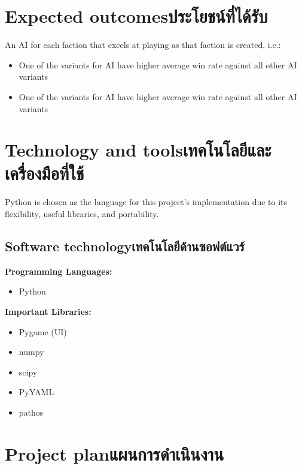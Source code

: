 \section{\ifenglish Expected outcomes\else ประโยชน์ที่ได้รับ\fi}
An AI for each faction that excels at playing as that faction is created, i.e.:
\begin{itemize}
    \item One of the variants for \Marquise{} AI have higher average win rate   against all other \Eyrie{} AI variants
    \item One of the variants for \Eyrie{} AI have higher average win rate against all other \Marquise{} AI variants
\end{itemize}

\section{\ifenglish Technology and tools\else เทคโนโลยีและเครื่องมือที่ใช้\fi}
Python is chosen as the language for this project's implementation due to its flexibility, useful libraries, and portability.


\subsection{\ifenglish Software technology\else เทคโนโลยีด้านซอฟต์แวร์\fi}
\textbf{Programming Languages:}
\begin{itemize}
    \item Python
\end{itemize}
\textbf{Important Libraries:}
\begin{itemize}
    \item Pygame (UI)
    \item numpy
    \item scipy
    \item PyYAML
    \item pathos
\end{itemize}

\section{\ifenglish Project plan\else แผนการดำเนินงาน\fi}


